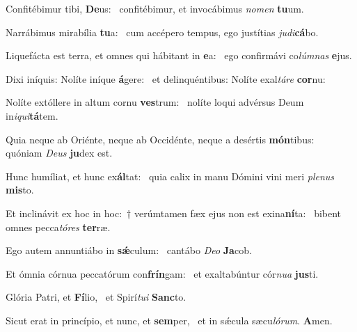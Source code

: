 \item Confitébimur tibi, \textbf{De}us:~\psstar{} confitébimur, et invocábimus \textit{nomen} \textbf{tu}um.
\item Narrábimus mirabília \textbf{tu}a:~\psstar{} cum accépero tempus, ego justítias \textit{judi}\textbf{cá}bo.
\item Liquefácta est terra, et omnes qui hábitant in \textbf{e}a:~\psstar{} ego confirmávi co\textit{lúmnas} \textbf{e}jus.
\item Dixi iníquis: Nolíte iníque \textbf{á}gere:~\psstar{} et delinquéntibus: Nolíte exal\textit{táre} \textbf{cor}nu:
\item Nolíte extóllere in altum cornu \textbf{ves}trum:~\psstar{} nolíte loqui advérsus Deum in\textit{iqui}\textbf{tá}tem.
\item Quia neque ab Oriénte, neque ab Occidénte, neque a desértis \textbf{món}tibus:~\psstar{} quóniam \textit{Deus} \textbf{ju}dex est.
\item Hunc humíliat, et hunc ex\textbf{ál}tat:~\psstar{} quia calix in manu Dómini vini meri \textit{plenus} \textbf{mis}to.
\item Et inclinávit ex hoc in hoc:~† verúmtamen fæx ejus non est exina\textbf{ní}ta:~\psstar{} bibent omnes pecca\textit{tóres} \textbf{ter}ræ.
\item Ego autem annuntiábo in \textbf{sǽ}culum:~\psstar{} cantábo \textit{Deo} \textbf{Ja}cob.
\item Et ómnia córnua peccatórum con\textbf{frín}gam:~\psstar{} et exaltabúntur cór\textit{nua} \textbf{jus}ti.
\item Glória Patri, et \textbf{Fí}lio,~\psstar{} et Spirí\textit{tui} \textbf{Sanc}to.
\item Sicut erat in princípio, et nunc, et \textbf{sem}per,~\psstar{} et in sǽcula sæcu\textit{lórum}. \textbf{A}men.
